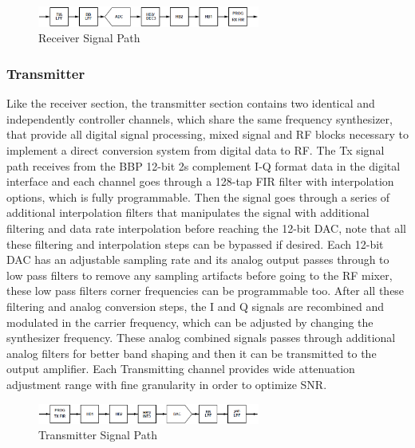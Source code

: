 \begin{figure}[htbp]
    \centering
    \includegraphics[width=0.65\textwidth]{./figures/rx_chain}
    \caption{ Receiver Signal Path
    \label{fig:rxchain}}
\end{figure}


\subsubsection{Transmitter}

Like the receiver section, the transmitter section contains two identical and independently controller channels, which share the same frequency synthesizer,  that provide all digital signal processing, mixed signal and RF blocks necessary to implement a direct conversion system from digital data to RF.
The Tx signal path receives from the BBP 12-bit 2s complement I-Q format data in the digital interface and each channel goes through a 128-tap FIR filter with interpolation options, which is fully programmable. Then the signal goes through a series of additional interpolation filters that manipulates the signal with additional filtering and data rate interpolation before reaching the 12-bit DAC, note that all these filtering and interpolation steps can be bypassed if desired.
Each 12-bit DAC has an adjustable sampling rate and its analog output passes through to low pass filters to remove any sampling artifacts before going to the RF mixer, these low pass filters corner frequencies can be programmable too. After all these filtering and analog conversion steps, the I and Q signals are recombined and modulated in the carrier frequency, which can be adjusted by changing the synthesizer frequency. These analog combined signals passes through additional analog filters for better band shaping and then it can be transmitted to the output amplifier. Each Transmitting channel provides wide attenuation adjustment range with fine granularity in order to optimize SNR.

\begin{figure}[htbp]
    \centering
    \includegraphics[width=0.65\textwidth]{./figures/tx_chain}
    \caption{ Transmitter Signal Path
    \label{fig:txchain}}
\end{figure}


